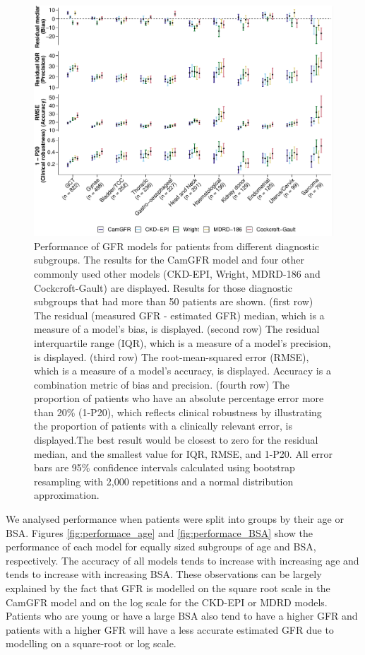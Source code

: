 \documentclass[11pt,]{article}
\begin{document}
\begin{figure}
\centering
\includegraphics{1_Validation_nonIDMS_files/figure-latex/PLOT_dagnosis-1.pdf}
\caption{\label{fig:performace_diagnosis}Performance of GFR models for
patients from different diagnostic subgroups. The results for the CamGFR
model and four other commonly used other models (CKD-EPI, Wright,
MDRD-186 and Cockcroft-Gault) are displayed. Results for those
diagnostic subgroups that had more than 50 patients are shown. (first
row) The residual (measured GFR - estimated GFR) median, which is a
measure of a model's bias, is displayed. (second row) The residual
interquartile range (IQR), which is a measure of a model's precision, is
displayed. (third row) The root-mean-squared error (RMSE), which is a
measure of a model's accuracy, is displayed. Accuracy is a combination
metric of bias and precision. (fourth row) The proportion of patients
who have an absolute percentage error more than 20\% (1-P20), which
reflects clinical robustness by illustrating the proportion of patients
with a clinically relevant error, is displayed.The best result would be
closest to zero for the residual median, and the smallest value for IQR,
RMSE, and 1-P20. All error bars are 95\% confidence intervals calculated
using bootstrap resampling with 2,000 repetitions and a normal
distribution approximation.}
\end{figure}

We analysed performance when patients were split into groups by their
age or BSA. Figures \ref{fig:performace_age} and
\ref{fig:performace_BSA} show the performance of each model for equally
sized subgroups of age and BSA, respectively. The accuracy of all models
tends to increase with increasing age and tends to increase with
increasing BSA. These observations can be largely explained by the fact
that GFR is modelled on the square root scale in the CamGFR model and on
the log scale for the CKD-EPI or MDRD models. Patients who are young or
have a large BSA also tend to have a higher GFR and patients with a
higher GFR will have a less accurate estimated GFR due to modelling on a
square-root or log scale.
\end{document}
